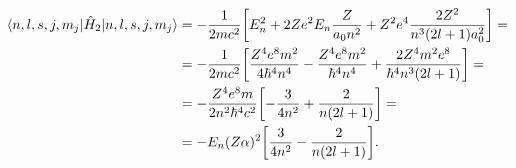 \begin{equation}
    \begin{split}
        \langle n,l,s,j,m_j\rvert\hat{H}_2\lvert n,l,s,j,m_j\rangle&=
        -\frac1{2mc^2}\biggl[E_n^2+2Ze^2E_n\frac{Z}{a_0n^2}+Z^2e^4\frac{2Z^2}{n^3(2l+1)a_0^2}\biggr]=\\&=
        -\frac1{2mc^2}\biggl[\frac{Z^4e^8m^2}{4\hbar^4n^4}-\frac{Z^4e^8m^2}{\hbar^4n^4}+\frac{2Z^4m^2e^8}{\hbar^4n^3(2l+1)}\biggr]=\\&=
        -\frac{Z^4e^8m}{2n^2\hbar^4c^2}\biggl[-\frac3{4n^2}+\frac{2}{n(2l+1)}\biggr]=\\&=
        -E_n(Z\alpha)^2\biggl[\frac3{4n^2}-\frac{2}{n(2l+1)}\biggr].
    \end{split}
    \label{eq:correzione-energia-cinetica-relativistica}
\end{equation}

